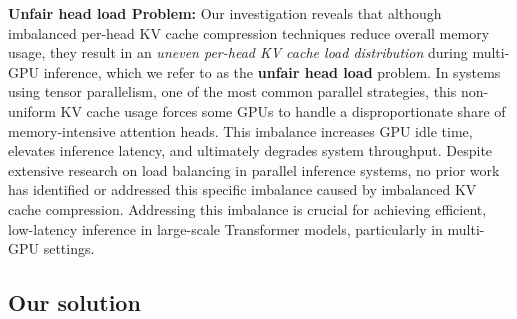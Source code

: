 %

\noindent\textbf{Unfair head load Problem:} 
Our investigation reveals that although imbalanced per-head KV cache compression techniques reduce overall memory usage, they result in an \textit{uneven per-head KV cache load distribution} during multi-GPU inference, which we refer to as the \textbf{unfair head load} problem. In systems using tensor parallelism, one of the most common parallel strategies, this non-uniform KV cache usage forces some GPUs to handle a disproportionate share of memory-intensive attention heads. This imbalance increases GPU idle time, elevates inference latency, and ultimately degrades system throughput.
Despite extensive research on load balancing in parallel inference systems, no prior work has identified or addressed this specific imbalance caused by imbalanced KV cache compression. Addressing this imbalance is crucial for achieving efficient, low-latency inference in large-scale Transformer models, particularly in multi-GPU settings.



\subsection{Our solution}

